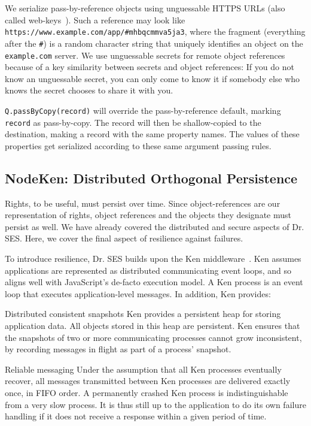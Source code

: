 \documentclass{llncs}
\begin{document}
We serialize pass-by-reference objects using unguessable HTTPS URLs (also called web-keys~\cite{Close:Webkeys}). Such a reference may look like {\tt https://www.example.com/app/\#mhbqcmmva5ja3}, where the fragment (everything after the {\tt \#}) is a random character string that uniquely identifies an object on the {\tt example.com} server. We use unguessable secrets for remote object references because of a key similarity between secrets and object references: If you do not know an unguessable secret, you can only come to know it if somebody else who knows the secret chooses to share it with you.

\begin{description*}
\item[{\tt Q.passByCopy(record)}] will override the pass-by-reference default, marking {\tt record} as pass-by-copy. The record will then be shallow-copied to the destination, making a record with the same property names. The values of these properties get serialized according to these same argument passing rules.
\end{description*}

\subsection{NodeKen: Distributed Orthogonal Persistence}
\label{NodeKen}

Rights, to be useful, must persist over time. Since object-references are our representation of rights, object references and the objects they designate must persist as well. We have already covered the distributed and secure aspects of Dr. SES. Here, we cover the final aspect of resilience against failures.

To introduce resilience, Dr. SES builds upon the Ken middleware~\cite{Yoo:CKen}. Ken assumes applications are represented as distributed communicating event loops, and so aligns well with JavaScript's de-facto execution model. A Ken process is an event loop that executes application-level messages. In addition, Ken provides:

\begin{description*}
  \item[Distributed consistent snapshots] Ken provides a persistent heap for storing application data. All objects stored in this heap are persistent. Ken ensures that the snapshots of two or more communicating processes cannot grow inconsistent, by recording messages in flight as part of a process' snapshot.
  \item[Reliable messaging] Under the assumption that all Ken processes eventually recover, all messages transmitted between Ken processes are delivered exactly once, in FIFO order. A permanently crashed Ken process is indistinguishable from a very slow process. It is thus still up to the application to do its own failure handling if it does not receive a response within a given period of time.
\end{description*}
\end{document}
